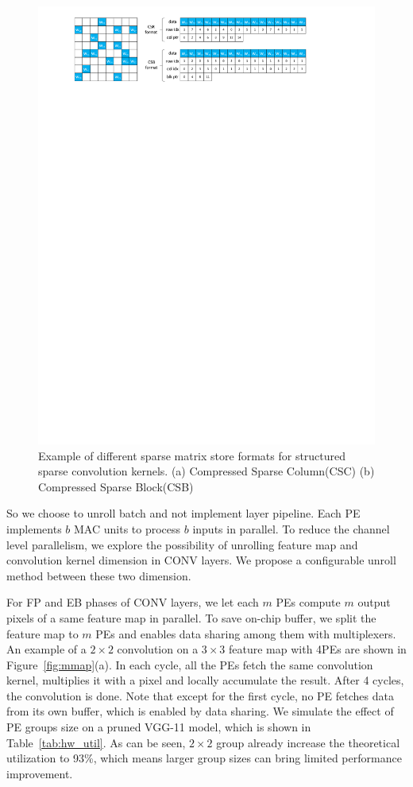 \begin{figure}[htb]
  \centering
  \includegraphics[width=2.0\columnwidth]{figures/csb.pdf}
  \caption{Example of different sparse matrix store formats for structured sparse convolution kernels. (a) Compressed Sparse Column(CSC) (b) Compressed Sparse Block(CSB)}
  \label{fig:csb}
\end{figure}

So we choose to unroll batch and not implement layer pipeline. Each PE implements $b$ MAC units to process $b$ inputs in parallel. To reduce the channel level parallelism, we explore the possibility of unrolling feature map and convolution kernel dimension in CONV layers. We propose a configurable unroll method between these two dimension. 

For FP and EB phases of CONV layers, we let each $m$ PEs compute $m$ output pixels of a same feature map in parallel. To save on-chip buffer, we split the feature map to $m$ PEs and enables data sharing among them with multiplexers. An example of a $2\times 2$ convolution on a $3\times 3$ feature map with 4PEs are shown in Figure~\ref{fig:mmap}(a). In each cycle, all the PEs fetch the same convolution kernel, multiplies it with a pixel and locally accumulate the result. After 4 cycles, the convolution is done. Note that except for the first cycle, no PE fetches data from its own buffer, which is enabled by data sharing. We simulate the effect of PE groups size on a pruned VGG-11 model, which is shown in Table~\ref{tab:hw_util}. As can be seen, $2\times 2$ group already increase the theoretical utilization to 93\%, which means larger group sizes can bring limited performance improvement. 

